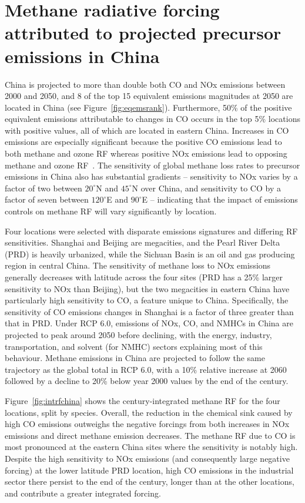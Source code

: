 \section{Methane radiative forcing attributed to projected precursor emissions in China}
\label{sec:china}
China is projected to more than double both CO and NOx emissions between 2000 and 2050, and 8 of the top 15 equivalent emissions magnitudes at 2050 are located in China (see Figure~\ref{fig:eqemsrank}). Furthermore, 50\% of the positive equivalent emissions attributable to changes in CO occurs in the top 5\% locations with positive values, all of which are located in eastern China. Increases in CO emissions are especially significant because the positive CO emissions lead to both methane and ozone RF whereas positive NOx emissions lead to opposing methane and ozone RF~\citep{ref:myhre2013}. The sensitivity of global methane loss rates to precursor emissions in China also has substantial gradients -- sensitivity to NOx varies by a factor of two between $20^{\circ}$N and $45^{\circ}$N over China, and sensitivity to CO by a factor of seven between $120^{\circ}$E and $90^{\circ}$E -- indicating that the impact of emissions controls on methane RF will vary significantly by location.

Four locations were selected with disparate emissions signatures and differing RF sensitivities. Shanghai and Beijing are megacities, and the Pearl River Delta (PRD) is heavily urbanized, while the Sichuan Basin is an oil and gas producing region in central China. The sensitivity of methane loss to NOx emissions generally decreases with latitude across the four sites (PRD has a 25\% larger sensitivity to NOx than Beijing), but the two megacities in eastern China have particularly high sensitivity to CO, a feature unique to China. Specifically, the sensitivity of CO emissions changes in Shanghai is a factor of three greater than that in PRD. Under RCP 6.0, emissions of NOx, CO, and NMHCs in China are projected to peak around 2050 before declining, with the energy, industry, transportation, and solvent (for NMHC) sectors explaining most of this behaviour. Methane emissions in China are projected to follow the same trajectory as the global total in RCP 6.0, with a 10\% relative increase at 2060 followed by a decline to 20\% below year 2000 values by the end of the century.

Figure~\ref{fig:intrfchina} shows the century-integrated methane RF for the four locations, split by species. Overall, the reduction in the chemical sink caused by high CO emissions outweighs the negative forcings from both increases in NOx emissions and direct methane emission decreases. The methane RF due to CO is most pronounced at the eastern China sites where the sensitivity is notably high. Despite the high sensitivity to NOx emissions (and consequently large negative forcing) at the lower latitude PRD location, high CO emissions in the industrial sector there persist to the end of the century, longer than at the other locations, and contribute a greater integrated forcing.